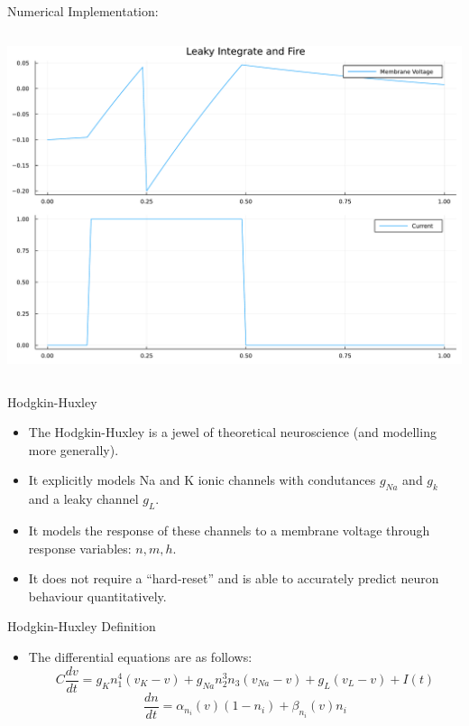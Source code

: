 \documentclass[
  ignorenonframetext,
]{beamer}
\providecommand{\tightlist}{%
  \setlength{\itemsep}{0pt}\setlength{\parskip}{0pt}}\usepackage{longtable,booktabs,array}
\begin{document}
\begin{frame}[fragile]{Numerical Implementation:}
\begin{columns}[T]
\begin{column}{0.5\textwidth}
\includegraphics{lecture2_files/figure-beamer/cell-5-output-1.pdf}
\end{column}
\end{columns}
\end{frame}

\begin{frame}{Hodgkin-Huxley}
\protect\hypertarget{hodgkin-huxley}{}
\begin{itemize}
\item
  The Hodgkin-Huxley is a jewel of theoretical neuroscience (and
  modelling more generally).
\item
  It explicitly models Na and K ionic channels with condutances
  \(g_{Na}\) and \(g_{k}\) and a leaky channel \(g_L\).
\item
  It models the response of these channels to a membrane voltage through
  response variables: \(n,m,h\).
\item
  It does not require a ``hard-reset'' and is able to accurately predict
  neuron behaviour quantitatively.
\end{itemize}
\end{frame}

\begin{frame}{Hodgkin-Huxley Definition}
\protect\hypertarget{hodgkin-huxley-definition}{}
\begin{itemize}
\tightlist
\item
  The differential equations are as follows:
  \[ C \frac{dv}{dt} = g_K n_1^4 (v_K - v) + g_{Na} n_2^3 n_3 (v_{Na} - v) + g_L(v_L - v) + I(t) \]
  \[ \frac{dn}{dt} = \alpha_{n_i}(v)(1-n_i)+\beta_{n_i}(v)n_i \]
\end{itemize}
\end{frame}
\end{document}
